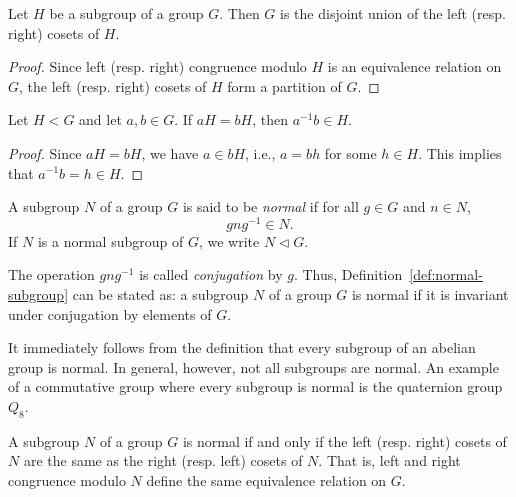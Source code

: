 \begin{theorem}
    Let \(H\) be a subgroup of a group \(G\). Then \(G\) is the disjoint union
    of the left (resp. right) cosets of \(H\).
\end{theorem}

\begin{proof}
    Since left (resp. right) congruence modulo \(H\) is an equivalence relation
    on \(G\), the left (resp. right) cosets of \(H\) form a partition of \(G\).
\end{proof}

\begin{theorem}
    Let \(H < G\) and let \(a, b \in G\). If \(aH = bH\), then \(a^{-1}b \in
    H\).
\end{theorem}

\begin{proof}
    Since \(aH = bH\), we have \(a \in bH\), i.e., \(a = bh\) for some \(h \in
    H\). This implies that \(a^{-1}b = h \in H\).
\end{proof}

\begin{definition}
    \label{def:normal-subgroup}
    A subgroup \(N\) of a group \(G\) is said to be \emph{normal} if for all \(g
    \in G\) and \(n \in N\),
    \[
        gng^{-1} \in N.
    \]
    If \(N\) is a normal subgroup of \(G\), we write \(N \triangleleft G\).
\end{definition}

\begin{remark}
    The operation \(gng^{-1}\) is called \emph{conjugation} by \(g\). Thus,
    Definition~\ref{def:normal-subgroup} can be stated as: a subgroup \(N\) of a
    group \(G\) is normal if it is invariant under conjugation by elements of
    \(G\).
\end{remark}

\begin{example}
    It immediately follows from the definition that every subgroup of an abelian
    group is normal. In general, however, not all subgroups are normal. An
    example of a commutative group where every subgroup is normal is the
    quaternion group \(Q_8\).
\end{example}

\begin{theorem}
    A subgroup \(N\) of a group \(G\) is normal if and only if the left (resp.
    right) cosets of \(N\) are the same as the right (resp. left) cosets of
    \(N\). That is, left and right congruence modulo \(N\) define the same
    equivalence relation on \(G\).
\end{theorem}


